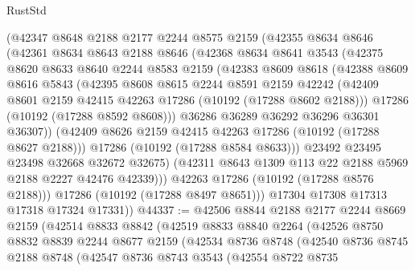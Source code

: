 \begin{lexlean}{RustStd}
\begin{coremodule}
          (@42347
            @8648
            @2188
            @2177
            @2244
            @8575
            @2159
            (@42355
              @8634
              @8646
              (@42361
                @8634
                @8643
                @2188
                @8646
                (@42368
                  @8634
                  @8641
                  @3543
                  (@42375
                    @8620
                    @8633
                    @8640
                    @2244
                    @8583
                    @2159
                    (@42383
                      @8609
                      @8618
                      (@42388
                        @8609
                        @8616
                        @5843
                        (@42395
                          @8608
                          @8615
                          @2244
                          @8591
                          @2159
                          @42242
                          (@42409 @8601 @2159 @42415 @42263 @17286 (@10192 (@17288 @8602 @2188)))
                          @17286
                          (@10192 (@17288 @8592 @8608)))
                        @36286
                        @36289
                        @36292
                        @36296
                        @36301
                        @36307))
                    (@42409 @8626 @2159 @42415 @42263 @17286 (@10192 (@17288 @8627 @2188)))
                    @17286
                    (@10192 (@17288 @8584 @8633)))
                  @23492
                  @23495
                  @23498
                  @32668
                  @32672
                  @32675)
                (@42311 @8643 @1309 @113 @22 @2188 @5969 @2188 @2227 @42476 @42339)))
            @42263
            @17286
            (@10192 (@17288 @8576 @2188)))
          @17286
          (@10192 (@17288 @8497 @8651)))
        @17304
        @17308
        @17313
        @17318
        @17324
        @17331))
@44337 := @42506
    @8844
    @2188
    @2177
    @2244
    @8669
    @2159
    (@42514
      @8833
      @8842
      (@42519
        @8833
        @8840
        @2264
        (@42526
          @8750
          @8832
          @8839
          @2244
          @8677
          @2159
          (@42534
            @8736
            @8748
            (@42540
              @8736
              @8745
              @2188
              @8748
              (@42547
                @8736
                @8743
                @3543
                (@42554
                  @8722
                  @8735

\end{coremodule}
\end{lexlean}
